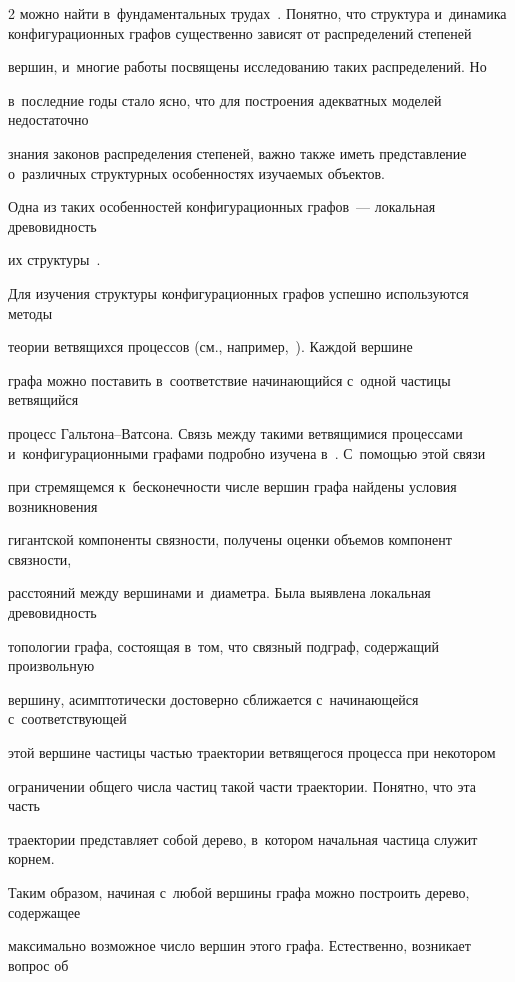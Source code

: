 \begin{multicols}{2}
можно найти в~фундаментальных трудах~\cite{Hof1, Hof2}. Понятно, что структура и~динамика конфигурационных графов существенно зависят от распределений степеней 


вершин, и~многие работы посвящены исследованию таких распределений. Но 


в~последние годы стало яс\-но, что для построения адекватных моделей недостаточно 


знания законов распределения степеней, важ\-но также иметь пред\-став\-ле\-ние о~различных структурных особенностях изуча\-емых объектов.


Одна из таких особенностей конфигурационных графов~--- локальная дре\-во\-вид\-ность 


их структуры~\cite{Hof1, Pav, PavCh}.





Для изучения структуры конфигурационных графов успешно используются методы 


теории вет\-вя\-щих\-ся процессов (см., например,~\cite{Hof1, Hof2}). Каждой вершине 


графа можно поставить в~соответствие начинающийся с~одной час\-ти\-цы вет\-вя\-щий\-ся 


процесс Гальтона--Ватсона. Связь между такими вет\-вя\-щи\-ми\-ся процессами и~конфигурационными графами подробно изучена в~\cite{Hof2}. С~по\-мощью этой связи 


при стремящемся к~бесконечности числе вершин графа найдены условия возникновения 


гигантской компоненты связности, получены оценки объемов компонент связности, 


расстояний между вершинами и~диаметра. Была выявлена локальная древовидность 


топологии графа, состоящая в~том, что связный подграф, содержащий произвольную 


вершину, асимптотически достоверно сближается с~начинающейся с~соответствующей 


этой вершине частицы частью траектории ветвящегося процесса при некотором 


ограничении общего числа час\-тиц такой час\-ти траектории. Понятно, что эта часть 


траектории представляет собой дерево, в~котором начальная частица служит корнем. 


Таким образом, начиная с~любой вершины графа можно построить дерево, содержащее 


максимально возможное число вершин этого графа. Естественно, возникает вопрос об 



\end{multicols}
